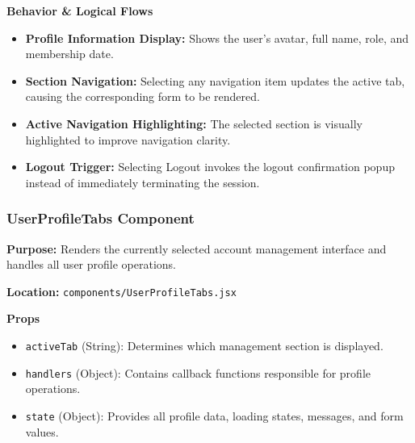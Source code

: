 \vspace{0.2cm}
\noindent\textbf{Behavior \& Logical Flows}
\begin{itemize}
    \item \textbf{Profile Information Display:} Shows the user's avatar, full name, role, and membership date.
    \item \textbf{Section Navigation:} Selecting any navigation item updates the active tab, causing the corresponding form to be rendered.
    \item \textbf{Active Navigation Highlighting:} The selected section is visually highlighted to improve navigation clarity.
    \item \textbf{Logout Trigger:} Selecting Logout invokes the logout confirmation popup instead of immediately terminating the session.
\end{itemize}


\subsubsection{UserProfileTabs Component}

\textbf{Purpose:} Renders the currently selected account management interface and handles all user profile operations.

\vspace{0.2cm}
\noindent\textbf{Location:} \texttt{components/UserProfileTabs.jsx}

\vspace{0.2cm}
\noindent\textbf{Props}
\begin{itemize}
    \item \texttt{activeTab} (String): Determines which management section is displayed.
    \item \texttt{handlers} (Object): Contains callback functions responsible for profile operations.
    \item \texttt{state} (Object): Provides all profile data, loading states, messages, and form values.
\end{itemize}

